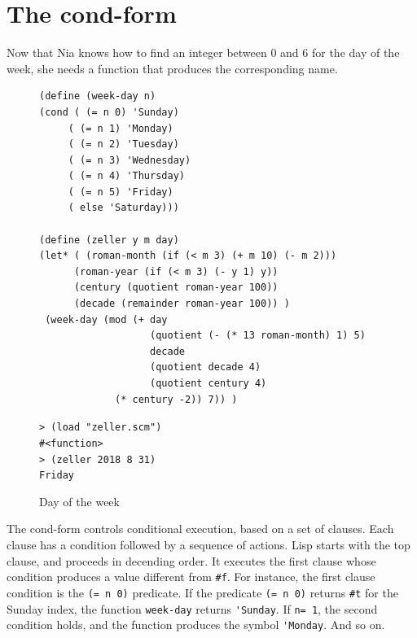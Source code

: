 \documentclass[a4paper,12pt]{book}
\newenvironment{fmpage}[1]
           {\begin{lrbox}{\fmbox}\begin{minipage}{#1}}
           {\end{minipage}\end{lrbox}\fbox{\usebox{\fmbox}}}
\begin{document}
\section{The cond-form}\label{page:cond-form}
Now that Nia knows how to find
an integer between 0 and 6 for the 
day of the week, she needs a function
that produces the corresponding name.


\begin{figure}[!h]
\begin{fmpage}{\linewidth}
\begin{verbatim}
(define (week-day n)
(cond ( (= n 0) 'Sunday)
     ( (= n 1) 'Monday)
     ( (= n 2) 'Tuesday)
     ( (= n 3) 'Wednesday)
     ( (= n 4) 'Thursday)
     ( (= n 5) 'Friday)
     ( else 'Saturday)))

(define (zeller y m day)
(let* ( (roman-month (if (< m 3) (+ m 10) (- m 2)))
      (roman-year (if (< m 3) (- y 1) y))
      (century (quotient roman-year 100))
      (decade (remainder roman-year 100)) )
 (week-day (mod (+ day
                   (quotient (- (* 13 roman-month) 1) 5)
                   decade
                   (quotient decade 4)
                   (quotient century 4)
             (* century -2)) 7)) )

\end{verbatim}
\end{fmpage}

\begin{fmpage}{\linewidth}
\verb|> (load "zeller.scm")|\\
\verb|#<function>|\\
\verb|> (zeller 2018 8 31)|\\
\verb|Friday|
\end{fmpage}
\caption{Day of the week}
\label{fig:day-of-the-week}
\end{figure}

The cond-form controls conditional
execution, based on a set of clauses.
Each clause has a condition followed by
a sequence of actions.  Lisp starts with the
top clause, and proceeds in decending order.
It executes the first clause whose 
condition produces a value different from \verb|#f|.
For instance, the first clause condition is
the \verb|(= n 0)| predicate.
If the predicate \verb|(= n 0)| 
returns \verb|#t| for the Sunday index,
the function \verb|week-day| returns \verb|'Sunday|.
If \verb|n= 1|, the second condition holds,
and the function produces the symbol \verb|'Monday|.
And so on.
\end{document}
